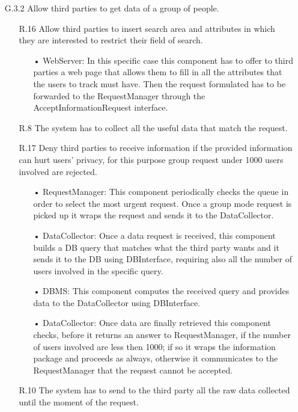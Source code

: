 \begin{enumerate}
\item [G.3.2] Allow third parties to get data of a group of people.
	\begin{enumerate}
	\item [R.16] Allow third parties to insert search area and attributes in which they are interested to restrict their field of search.
		\begin{enumerate}
		\item[•] WebServer: In this specific case this component has to offer to third parties a web page that allows them to fill in all the attributes that the users to track must have. Then the request formulated has to be forwarded to the RequestManager through the AcceptInformationRequest interface.
		\end{enumerate}	
		
	\item [R.8] The system has to collect all the useful data that match the request.
	\item [R.17] Deny third parties to receive information if the provided information can hurt users' privacy, for this purpose group request under 1000 users involved are rejected.
		\begin{enumerate}
		\item[•] RequestManager: This component periodically checks the queue in order to select the most urgent request. Once a group mode request is picked up it wraps the request and sends it to the DataCollector.
		\item[•] DataCollector: Once a data request is received, this component builds a DB query that matches what the third party wants and it sends it to the DB using DBInterface, requiring also all the number of users involved in the specific query.
		\item[•] DBMS: This component computes the received query and provides data to the DataCollector using DBInterface.
		\item[•] DataCollector: Once data are finally retrieved this component checks, before it returns an answer to RequestManager, if the number of users involved are less then 1000; if so it wraps the information package and proceeds as always, otherwise it communicates to the RequestManager that the request cannot be accepted.
		\end{enumerate}	
		
	\item [R.10] The system has to send to the third party all the raw data collected until the moment of the request.
	\end{enumerate}
	

\end{enumerate}
